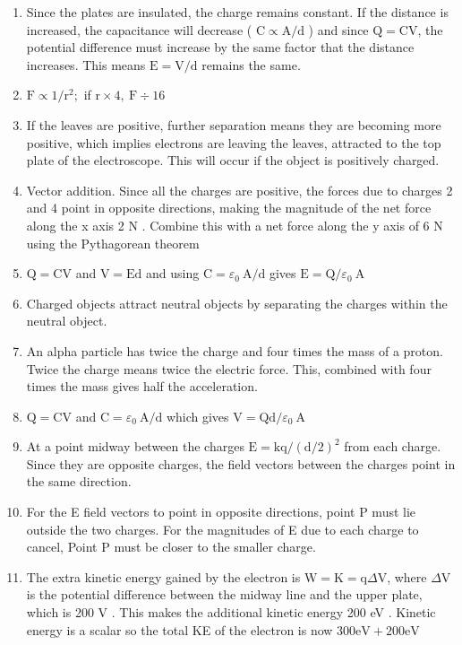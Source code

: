 \begin{enumerate}
\begin{enumerate}
  \item Since the plates are insulated, the charge remains constant. If the distance is increased, the capacitance will decrease ( $\mathrm{C} \propto \mathrm{A} / \mathrm{d}$ ) and since $\mathrm{Q}=\mathrm{CV}$, the potential difference must increase by the same factor that the distance increases. This means $\mathrm{E}=\mathrm{V} / \mathrm{d}$ remains the same.
  \item $\mathrm{F} \propto 1 / \mathrm{r}^{2} ;$ if $\mathrm{r} \times 4, \mathrm{~F} \div 16$
  \item If the leaves are positive, further separation means they are becoming more positive, which implies electrons are leaving the leaves, attracted to the top plate of the electroscope. This will occur if the object is positively charged.
  \item Vector addition. Since all the charges are positive, the forces due to charges 2 and 4 point in opposite directions, making the magnitude of the net force along the x axis 2 N . Combine this with a net force along the y axis of 6 N using the Pythagorean theorem
  \item $\mathrm{Q}=\mathrm{CV}$ and $\mathrm{V}=\mathrm{Ed}$ and using $\mathrm{C}=\varepsilon_{0} \mathrm{~A} / \mathrm{d}$ gives $\mathrm{E}=\mathrm{Q} / \varepsilon_{0} \mathrm{~A}$
  \item Charged objects attract neutral objects by separating the charges within the neutral object.
  \item An alpha particle has twice the charge and four times the mass of a proton. Twice the charge means twice the electric force. This, combined with four times the mass gives half the acceleration.
  \item $\mathrm{Q}=\mathrm{CV}$ and $\mathrm{C}=\varepsilon_{0} \mathrm{~A} / \mathrm{d}$ which gives $\mathrm{V}=\mathrm{Qd} / \varepsilon_{0} \mathrm{~A}$
  \item At a point midway between the charges $\mathrm{E}=\mathrm{kq} /(\mathrm{d} / 2)^{2}$ from each charge. Since they are opposite charges, the field vectors between the charges point in the same direction.
  \item For the E field vectors to point in opposite directions, point P must lie outside the two charges. For the magnitudes of E due to each charge to cancel, Point P must be closer to the smaller charge.
  \item The extra kinetic energy gained by the electron is $\mathrm{W}=\mathrm{K}=\mathrm{q} \Delta \mathrm{V}$, where $\Delta \mathrm{V}$ is the potential difference between the midway line and the upper plate, which is 200 V . This makes the additional kinetic energy 200 eV . Kinetic energy is a scalar so the total KE of the electron is now $300 \mathrm{eV}+200 \mathrm{eV}$

\end{enumerate}
\end{enumerate}
